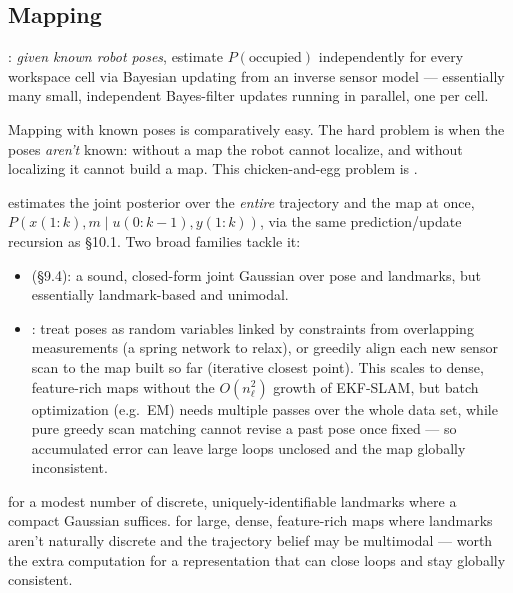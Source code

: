 \subsection{Mapping}
: \emph{given known robot poses}, estimate $P(\text{occupied})$ independently for every workspace cell via Bayesian updating from an inverse sensor model --- essentially many small, independent Bayes-filter updates running in parallel, one per cell.
\begin{notebox}
Mapping with known poses is comparatively easy. The hard problem is when the poses \emph{aren't} known: without a map the robot cannot localize, and without localizing it cannot build a map. This chicken-and-egg problem is .
\end{notebox}
 estimates the joint posterior over the \emph{entire} trajectory and the map at once, $P(x(1{:}k),m\mid u(0{:}k{-}1),y(1{:}k))$, via the same prediction/update recursion as \S10.1. Two broad families tackle it:
\begin{itemize}
\item {} (\S9.4): a sound, closed-form joint Gaussian over pose and landmarks, but essentially landmark-based and unimodal.
\item {}: treat poses as random variables linked by constraints from overlapping measurements (a spring network to relax), or greedily align each new sensor scan to the map built so far (iterative closest point). This scales to dense, feature-rich maps without the $O(n_\ell^2)$ growth of EKF-SLAM, but batch optimization (e.g.\ EM) needs multiple passes over the whole data set, while pure greedy scan matching cannot revise a past pose once fixed --- so accumulated error can leave large loops unclosed and the map globally inconsistent.
\end{itemize}
 for a modest number of discrete, uniquely-identifiable landmarks where a compact Gaussian suffices.  for large, dense, feature-rich maps where landmarks aren't naturally discrete and the trajectory belief may be multimodal --- worth the extra computation for a representation that can close loops and stay globally consistent.

